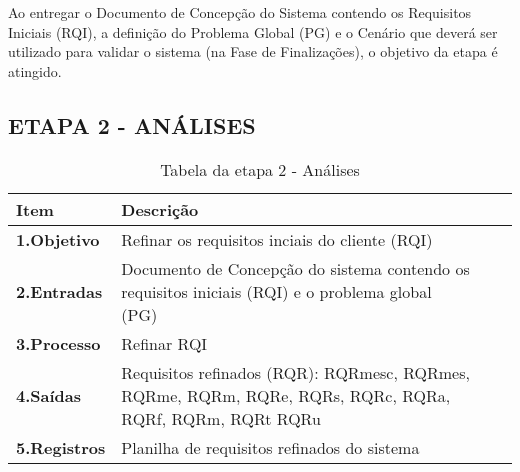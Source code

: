 Ao entregar o Documento de Concepção do Sistema contendo os Requisitos Iniciais (RQI), a definição do Problema Global (PG) e o Cenário que deverá ser utilizado para validar o sistema (na Fase de Finalizações), o objetivo da etapa é atingido.


\cleardoublepage
\subsection{ETAPA 2 - ANÁLISES}
\begin{description}
\begin{table}[htbp]
	\centering
	\caption{Tabela da etapa 2 - Análises}
	\begin{tabular}{|l| p{13.5cm}| c| c| } \hline
		\textbf{Item} 	    & \textbf{Descrição} 
		\\ \hline
		\textbf{1.Objetivo}	   &  
		Refinar os requisitos inciais do cliente (RQI)\\ \hline
		\textbf{2.Entradas}	  &		
		Documento de Concepção do sistema contendo os requisitos iniciais (RQI) e o problema global (PG)\par  	
		\\ \hline	
		\textbf{3.Processo}     &
		Refinar RQI\\ \hline
		\textbf{4.Saídas}		& 
		Requisitos refinados (RQR): RQRmesc, RQRmes, RQRme, RQRm, RQRe, RQRs, RQRc, RQRa, RQRf, RQRm, RQRt RQRu 
		\\ \hline
		\textbf{5.Registros}   & 	
		Planilha de requisitos refinados do sistema\\ \hline
	\end{tabular}
	\label{T4}\par
\end{table}


\end{description}
